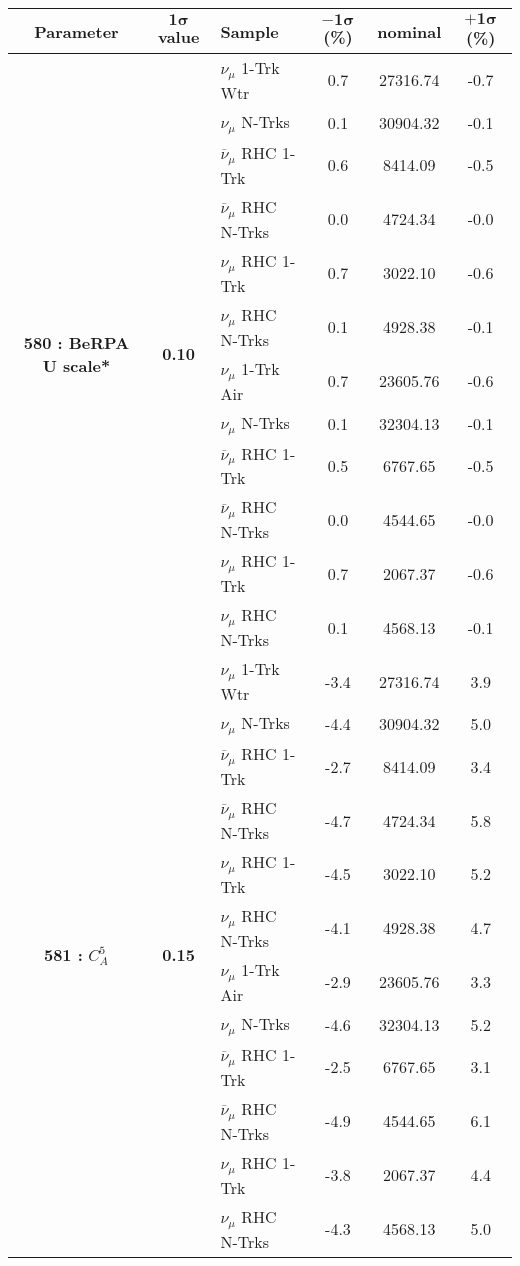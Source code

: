 \addtocounter{table}{-1}
\begin{table}[ht!]
\centering

\begin{tabular}{ c  c  l  c  c  c }
\midrule[1.3pt]
\textbf{Parameter} & \textbf{$\mathbf{1\sigma}$ value} & \textbf{Sample} & \textbf{$\mathbf{-1\sigma}$ (\%)}  &  \textbf{nominal}  &  \textbf{$\mathbf{+1\sigma}$ (\%)} \\
\midrule[1.3pt]
\multirow{12}{*}{\textbf{580 : BeRPA U scale*}} & \multirow{12}{*}{\textbf{0.10}} & $\nu_\mu$ 1-Trk Wtr &   0.7 &  27316.74 &   -0.7 \\ 
 &  & $\nu_\mu$ N-Trks &   0.1 &  30904.32 &   -0.1 \\ 
 &  & $\overline{\nu}_\mu$ RHC 1-Trk &   0.6 &  8414.09 &   -0.5 \\ 
 &  & $\overline{\nu}_\mu$ RHC N-Trks &   0.0 &  4724.34 &   -0.0 \\ 
 &  & $\nu_\mu$ RHC 1-Trk &   0.7 &  3022.10 &   -0.6 \\ 
 &  & $\nu_\mu$ RHC N-Trks &   0.1 &  4928.38 &   -0.1 \\ 
 &  & $\nu_\mu$ 1-Trk Air &   0.7 &  23605.76 &   -0.6 \\ 
 &  & $\nu_\mu$ N-Trks &   0.1 &  32304.13 &   -0.1 \\ 
 &  & $\overline{\nu}_\mu$ RHC 1-Trk &   0.5 &  6767.65 &   -0.5 \\ 
 &  & $\overline{\nu}_\mu$ RHC N-Trks &   0.0 &  4544.65 &   -0.0 \\ 
 &  & $\nu_\mu$ RHC 1-Trk &   0.7 &  2067.37 &   -0.6 \\ 
 &  & $\nu_\mu$ RHC N-Trks &   0.1 &  4568.13 &   -0.1 \\ 
\midrule[1.3pt]
\multirow{12}{*}{\textbf{581 : }$C_A^5$} & \multirow{12}{*}{\textbf{0.15}} & $\nu_\mu$ 1-Trk Wtr &   -3.4 &  27316.74 &   3.9 \\ 
 &  & $\nu_\mu$ N-Trks &   -4.4 &  30904.32 &   5.0 \\ 
 &  & $\overline{\nu}_\mu$ RHC 1-Trk &   -2.7 &  8414.09 &   3.4 \\ 
 &  & $\overline{\nu}_\mu$ RHC N-Trks &   -4.7 &  4724.34 &   5.8 \\ 
 &  & $\nu_\mu$ RHC 1-Trk &   -4.5 &  3022.10 &   5.2 \\ 
 &  & $\nu_\mu$ RHC N-Trks &   -4.1 &  4928.38 &   4.7 \\ 
 &  & $\nu_\mu$ 1-Trk Air &   -2.9 &  23605.76 &   3.3 \\ 
 &  & $\nu_\mu$ N-Trks &   -4.6 &  32304.13 &   5.2 \\ 
 &  & $\overline{\nu}_\mu$ RHC 1-Trk &   -2.5 &  6767.65 &   3.1 \\ 
 &  & $\overline{\nu}_\mu$ RHC N-Trks &   -4.9 &  4544.65 &   6.1 \\ 
 &  & $\nu_\mu$ RHC 1-Trk &   -3.8 &  2067.37 &   4.4 \\ 
 &  & $\nu_\mu$ RHC N-Trks &   -4.3 &  4568.13 &   5.0 \\ 
\midrule[1.3pt]
\end{tabular}
\end{table}
